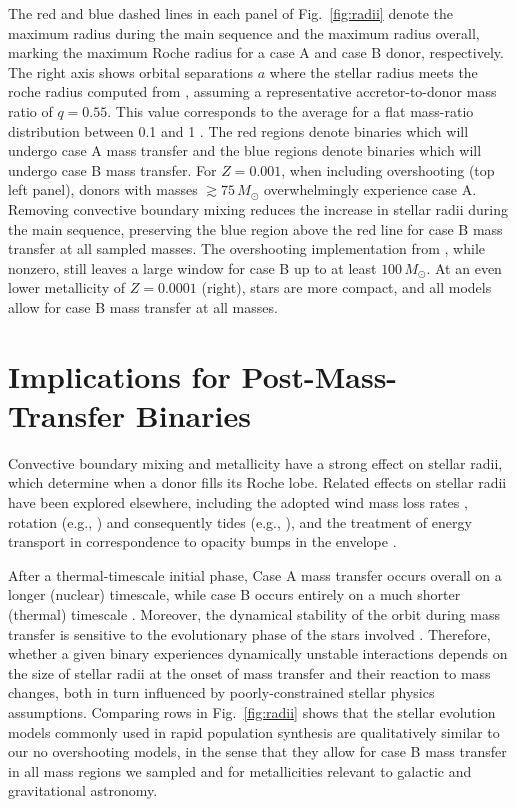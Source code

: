 \documentclass[twocolumn]{aastex63}
\DeclareRobustCommand{\Figref}[1]{Fig.~\ref{#1}}
\begin{document}
The red and blue dashed lines in each panel of \Figref{fig:radii}
denote the maximum radius during the main sequence and the maximum
radius overall, marking the maximum Roche radius for a case A and case
B donor, respectively. The right axis shows orbital separations $a$
where the stellar radius meets the roche radius computed from
\citet{eggleton:83}, assuming a representative accretor-to-donor mass
ratio of $q=0.55$. This value corresponds to the average for a flat
mass-ratio distribution between 0.1 and 1
\citep{kobulnicky:07,sana:12}. The red regions denote binaries which
will undergo case A mass transfer and the blue regions denote binaries
which will undergo case B mass transfer. For $Z=0.001$, when including
overshooting (top left panel), donors with masses
$ \gtrsim 75 \, M_{\odot}$ overwhelmingly experience case A.  Removing
convective boundary mixing reduces the increase in stellar radii
during the main sequence, preserving the blue region above the red
line for case B mass transfer at all sampled masses. The overshooting
implementation from \cite{pols:98}, while nonzero, still leaves a
large window for case B up to at least $100 \, M_{\odot}$. At an even
lower metallicity of $Z=0.0001$ (right), stars are more compact, and
all models allow for case B mass transfer at all masses.

\section{Implications for Post-Mass-Transfer Binaries}

Convective boundary mixing \citep{brott:11, johnston:24} and
metallicity \citep[e.g.,][]{xin:22} have a strong effect on stellar
radii, which determine when a donor fills its Roche lobe. Related
effects on stellar radii have been explored elsewhere, including the
adopted wind mass loss rates \citep[e.g.,][]{smith:14, renzo:17,
  josiek:24}, rotation (e.g., \citealt{maeder:00}) and consequently
tides (e.g., \citealt{fabry:22}), and the treatment of energy
transport in correspondence to opacity bumps in the envelope
\citep[e.g.,][]{joss:73, agrawal:22, cheng:24}.

After a thermal-timescale initial phase, Case A mass transfer occurs
overall on a longer (nuclear) timescale, while case B occurs entirely
on a much shorter (thermal) timescale \citep[but see][]{klencki:22}.
Moreover, the dynamical stability of the orbit during mass transfer is
sensitive to the evolutionary phase of the stars involved
\citep[e.g.,][]{claeys:14}. Therefore, whether a given binary
experiences dynamically unstable interactions depends on the size of
stellar radii at the onset of mass transfer and their reaction to mass
changes, both in turn influenced by poorly-constrained stellar physics
assumptions. Comparing rows in \Figref{fig:radii} shows that the
stellar evolution models commonly used in rapid population synthesis
are qualitatively similar to our no overshooting models, in the sense
that they allow for case B mass transfer in all mass regions we
sampled and for metallicities relevant to galactic and gravitational
astronomy.
\end{document}
